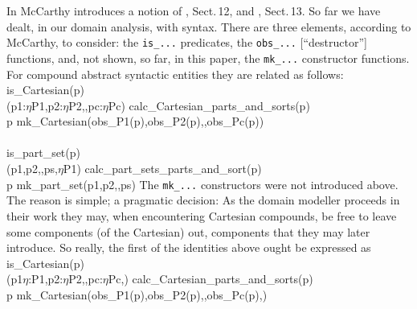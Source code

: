 \pind In \cite{Mc62a} McCarthy introduces a notion of , Sect.\,12, and , Sect.\,13.
\pind So far we have dealt, in our domain analysis, with syntax.
\pind There are three elements, according to McCarthy, to consider:
\begynd
\pind the \texttt{is\_...} predicates,
\pind the \texttt{obs\_...} [``destructor''] functions, and, not shown, so far, in this
      paper, 
\pind the \texttt{mk\_...} constructor functions.
\afslut
\pind For compound abstract syntactic entities they are related as follows:
%
\bp
\>\>\>is\_Cartesian(p) {\IS}\\
\>\>\>\>\> (p1:$\eta$P1,p2:$\eta$P2,{\DOTDOTDOT},pc:$\eta$Pc) {\EQ} calc\_Cartesian\_parts\_and\_sorts(p) \\
\>\>\>\>\>p {\EQ} mk\_Cartesian(obs\_P1(p),obs\_P2(p),{\DOTDOTDOT},obs\_Pc(p)) \\
\\
\>\>\>is\_part\_set(p) {\IS}\\
\>\>\>\>\> ({\LBRACE}p1,p2,{\DOTDOTDOT},ps{\RBRACE},$\eta$P1) {\EQ} calc\_part\_sets\_parts\_and\_sort(p) \\
\>\>\>\>\>p {\EQ} mk\_part\_set({\LBRACE}p1,p2,{\DOTDOTDOT},ps{\RBRACE}) 
\ep
\noindent
\pind The \texttt{mk\_...} constructors were not introduced above.
\pind The reason is simple; a pragmatic decision:
\begynd
\pind As the domain modeller proceeds in their work
\pind they may, when encountering Cartesian compounds,
\pind be free to leave some components (of the Cartesian) out,
\pind components that they may later introduce.
\afslut
\pind So really, the first of the identities above ought be expressed as
\afslut
\bp
\>\>\>is\_Cartesian(p) {\IS}\\
\>\>\>\>\> (p1$\eta$:P1,p2:$\eta$P2,{\DOTDOTDOT},pc:$\eta$Pc,{\DOTDOTDOT}) {\EQ} calc\_Cartesian\_parts\_and\_sorts(p) \\
\>\>\>\>\>p {\EQ} mk\_Cartesian(obs\_P1(p),obs\_P2(p),{\DOTDOTDOT},obs\_Pc(p),{\DOTDOTDOT})  
\ep

